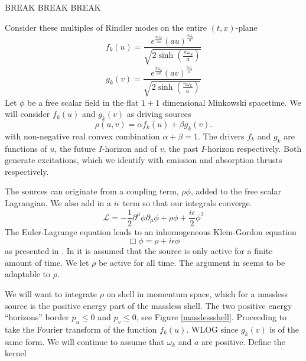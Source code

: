 \documentclass[12pt,a4paper]{article}
\begin{document}
BREAK BREAK BREAK


Consider these multiples of Rindler modes on the entire $(t,x)$-plane
\begin{equation}
f_k(u) = \frac{e^{\frac{\pi \omega_k}{2a}} {(au)}^{\frac{i\omega_k}{a}}}{ \sqrt{2\sinh\left(\frac{\pi\omega_k}{a}\right)}}
\end{equation}
\begin{equation}
g_k(v) = \frac{e^{\frac{\pi \omega_k}{2a}} {(av)}^{\frac{i\omega_k}{a}}}{ \sqrt{2\sinh\left(\frac{\pi\omega_k}{a}\right)} }
\end{equation}
Let $\phi$ be a free scalar field in the flat $1+1$ dimensional Minkowski spacetime.  We will consider $f_k(u)$ and $g_k(v)$ as driving sources
\begin{equation}
\label{ab}
\rho(u,v) = \alpha f_k(u) + \beta g_k(v).
\end{equation}
with non-negative real convex combination $\alpha + \beta = 1$. The drivers $f_k$ and $g_k$ are functions of $u$, the future $I$-horizon and of $v$, the past $I$-horizon respectively.  Both generate excitations, which we identify with emission and absorption thrusts respectively.


The sources can originate from a coupling term, $\rho \phi$, added to the free scalar Lagrangian.  We also add in a $i \epsilon$ term so that our integrals converge.
\begin{equation}
\mathscr{L} = -\frac{1}{2} \partial^\mu \phi \partial_\mu \phi + \rho\phi + \frac{i \epsilon}{2}  \phi^2
\end{equation}
The Euler-Lagrange equation leads to an inhomogeneous Klein-Gordon equation
\begin{equation}
  \Box  \phi = \rho + i \epsilon \phi
\end{equation}
as presented in \cite{beisert}.  In \cite{beisert} it is assumed that the source is only active for a finite amount of time.  We let $\rho$ be active for all time.  The argument in \cite{beisert} seems to be adaptable to $\rho$.

We will want to integrate $\rho$ on shell in momentum space, which for a massless source is the positive energy part of the massless shell.  The two positive energy ``horizons'' border $p_u \le 0$ and $p_v \le 0$, see Figure \ref{masslessshell}.  Proceeding to take the Fourier transform of the function $f_k(u)$.  WLOG since $g_k(v)$ is of the same form.  We will continue to assume that $\omega_k$ and $a$ are positive. Define the kernel
\end{document}
